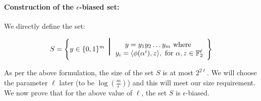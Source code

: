 \paragraph{Construction of the $\epsilon$-biased set:} We directly define the set:

$$ S = \left\{ y \in \{0,1\}^m ~\bigger{\bigger{\bigger{|}}}
\begin{array}{c}
y = y_1y_2 \ldots y_m \textrm{ where }\\
y_i = \langle \phi(\alpha^i), z \rangle, \textrm{ for } \alpha,z \in \F_2^\ell 
\end{array}
\right\}
$$

As per the above formulation, the size of the set $S$ is at most $2^{2\ell}$. We will choose the parameter $\ell$ later (to be $\log\left(\frac{m}{\epsilon}\right)$) and this will meet our size requirement. We now prove that for the above value of $\ell$, the set $S$ is $\epsilon$-biased.


